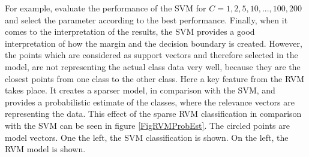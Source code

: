 For example, evaluate the performance of the \ac{SVM} for $C={1,2,5,10,...,100,200}$ and select the parameter according to the best performance.\cite{Chen.2009}\newline
Finally, when it comes to the interpretation of the results, the \ac{SVM} provides a good interpretation of how the margin and the decision boundary is created.
However, the points which are considered as support vectors and therefore selected in the model, are not representing the actual class data very well, because they are the closest points from one class to the other class.\cite[p. 326]{Bishop.2009}\newline
Here a key feature from the \ac{RVM} takes place. It creates a sparser model, in comparison with the \ac{SVM}, and provides a probabilistic estimate of the classes, where the relevance vectors are representing the data.\cite[p. 335-356]{Bishop.2009}\newline
This effect of the sparse \acs{RVM} classification in comparison with the \acs{SVM} can be seen in figure \ref{FigRVMProbEst}.
The circled points are model vectors. One the left, the \acs{SVM} classification is shown. On the left, the \acs{RVM} model is shown.
